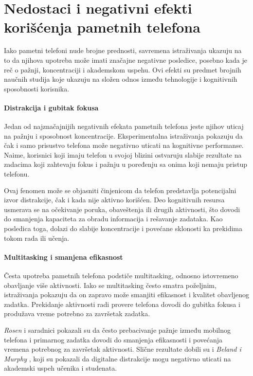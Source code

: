 \documentclass{article}
\begin{document}
\section{Nedostaci i negativni efekti korišćenja pametnih telefona}

Iako pametni telefoni nude brojne prednosti, savremena istraživanja ukazuju na to da njihova upotreba može imati značajne negativne posledice, posebno kada je reč o pažnji, koncentraciji i akademskom uspehu. Ovi efekti su predmet brojnih naučnih studija koje ukazuju na složen odnos između tehnologije i kognitivnih sposobnosti korisnika.

\paragraph{Distrakcija i gubitak fokusa}

Jedan od najznačajnijih negativnih efekata pametnih telefona jeste njihov uticaj na pažnju i sposobnost koncentracije. Eksperimentalna istraživanja pokazuju da čak i samo prisustvo telefona može negativno uticati na kognitivne performanse. Naime, korisnici koji imaju telefon u svojoj blizini ostvaruju slabije rezultate na zadacima koji zahtevaju fokus i pažnju u poređenju sa onima koji nemaju pristup telefonu.

Ovaj fenomen može se objasniti činjenicom da telefon predstavlja potencijalni izvor distrakcije, čak i kada nije aktivno korišćen. Deo kognitivnih resursa usmerava se na očekivanje poruka, obaveštenja ili drugih aktivnosti, što dovodi do smanjenja kapaciteta za obradu informacija i rešavanje zadataka. Kao posledica toga, dolazi do slabije koncentracije i povećane sklonosti ka prekidima tokom rada ili učenja.

\paragraph{Multitasking i smanjena efikasnost}

Česta upotreba pametnih telefona podstiče multitasking, odnosno istovremeno obavljanje više aktivnosti. Iako se multitasking često smatra poželjnim, istraživanja pokazuju da on zapravo može smanjiti efikasnost i kvalitet obavljenog zadatka. Prekidanje aktivnosti radi provere telefona dovodi do gubitka fokusa i produžava vreme potrebno za završetak zadatka.

\textit{Rosen} i saradnici \cite{Rosen2013} pokazali su da često prebacivanje pažnje između mobilnog telefona i primarnog zadatka dovodi do smanjenja efikasnosti i povećanja vremena potrebnog za završetak aktivnosti. Slične rezultate dobili su i \textit{Beland i Murphy} \cite{Beland2016}, koji su pokazali da digitalne distrakcije mogu negativno uticati na akademski uspeh učenika i studenata.
\end{document}
